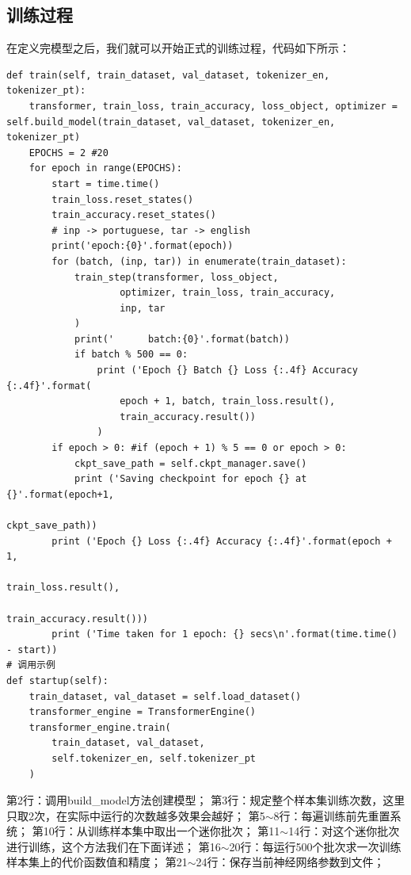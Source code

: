 \documentclass{article}
\begin{document}
\subsection{训练过程}
在定义完模型之后，我们就可以开始正式的训练过程，代码如下所示：
\begin{lstlisting}
def train(self, train_dataset, val_dataset, tokenizer_en, tokenizer_pt):
    transformer, train_loss, train_accuracy, loss_object, optimizer = self.build_model(train_dataset, val_dataset, tokenizer_en, tokenizer_pt)
    EPOCHS = 2 #20
    for epoch in range(EPOCHS):
        start = time.time()
        train_loss.reset_states()
        train_accuracy.reset_states()
        # inp -> portuguese, tar -> english
        print('epoch:{0}'.format(epoch))
        for (batch, (inp, tar)) in enumerate(train_dataset):
            train_step(transformer, loss_object,
                    optimizer, train_loss, train_accuracy,
                    inp, tar
            )
            print('      batch:{0}'.format(batch))
            if batch % 500 == 0:
                print ('Epoch {} Batch {} Loss {:.4f} Accuracy {:.4f}'.format(
                    epoch + 1, batch, train_loss.result(), 
                    train_accuracy.result())
                )
        if epoch > 0: #if (epoch + 1) % 5 == 0 or epoch > 0:
            ckpt_save_path = self.ckpt_manager.save()
            print ('Saving checkpoint for epoch {} at {}'.format(epoch+1,
                                                                ckpt_save_path))
        print ('Epoch {} Loss {:.4f} Accuracy {:.4f}'.format(epoch + 1, 
                                                        train_loss.result(), 
                                                        train_accuracy.result()))
        print ('Time taken for 1 epoch: {} secs\n'.format(time.time() - start))
# 调用示例
def startup(self):
    train_dataset, val_dataset = self.load_dataset()
    transformer_engine = TransformerEngine()
    transformer_engine.train(
        train_dataset, val_dataset,
        self.tokenizer_en, self.tokenizer_pt
    )
\end{lstlisting}
第2行：调用build\_model方法创建模型；
第3行：规定整个样本集训练次数，这里只取2次，在实际中运行的次数越多效果会越好；
第5$\sim$8行：每遍训练前先重置系统；
第10行：从训练样本集中取出一个迷你批次；
第11$\sim$14行：对这个迷你批次进行训练，这个方法我们在下面详述；
第16$\sim$20行：每运行500个批次求一次训练样本集上的代价函数值和精度；
第21$\sim$24行：保存当前神经网络参数到文件；
\end{document}
